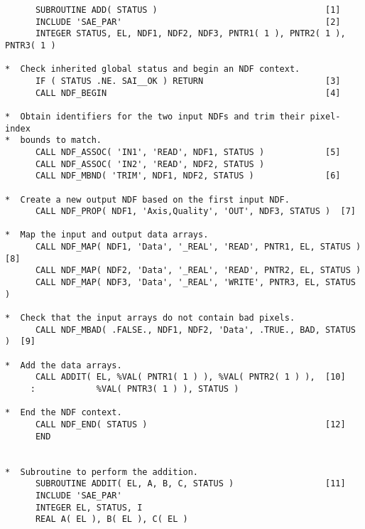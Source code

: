 \documentclass[twoside,11pt]{article}
\begin{document}
\small
\begin{verbatim}
      SUBROUTINE ADD( STATUS )                                 [1]
      INCLUDE 'SAE_PAR'                                        [2]
      INTEGER STATUS, EL, NDF1, NDF2, NDF3, PNTR1( 1 ), PNTR2( 1 ), PNTR3( 1 )
                                                              
*  Check inherited global status and begin an NDF context.    
      IF ( STATUS .NE. SAI__OK ) RETURN                        [3]
      CALL NDF_BEGIN                                           [4]
                                                              
*  Obtain identifiers for the two input NDFs and trim their pixel-index
*  bounds to match.                                           
      CALL NDF_ASSOC( 'IN1', 'READ', NDF1, STATUS )            [5]
      CALL NDF_ASSOC( 'IN2', 'READ', NDF2, STATUS )           
      CALL NDF_MBND( 'TRIM', NDF1, NDF2, STATUS )              [6]
                                                              
*  Create a new output NDF based on the first input NDF.      
      CALL NDF_PROP( NDF1, 'Axis,Quality', 'OUT', NDF3, STATUS )  [7]
                                                              
*  Map the input and output data arrays.                      
      CALL NDF_MAP( NDF1, 'Data', '_REAL', 'READ', PNTR1, EL, STATUS )  [8]
      CALL NDF_MAP( NDF2, 'Data', '_REAL', 'READ', PNTR2, EL, STATUS )
      CALL NDF_MAP( NDF3, 'Data', '_REAL', 'WRITE', PNTR3, EL, STATUS )
                                                              
*  Check that the input arrays do not contain bad pixels.     
      CALL NDF_MBAD( .FALSE., NDF1, NDF2, 'Data', .TRUE., BAD, STATUS )  [9]
                                                              
*  Add the data arrays.                                       
      CALL ADDIT( EL, %VAL( PNTR1( 1 ) ), %VAL( PNTR2( 1 ) ),  [10]
     :            %VAL( PNTR3( 1 ) ), STATUS )                
                                                              
*  End the NDF context.                                       
      CALL NDF_END( STATUS )                                   [12]
      END                                                     
                                                              
                                                              
*  Subroutine to perform the addition.                        
      SUBROUTINE ADDIT( EL, A, B, C, STATUS )                  [11]
      INCLUDE 'SAE_PAR'                                       
      INTEGER EL, STATUS, I                                   
      REAL A( EL ), B( EL ), C( EL )                          
                                                              

\end{verbatim}
\end{document}
